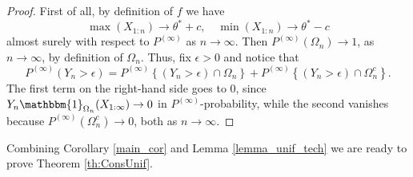 \documentclass[12pt]{article}
\begin{document}
\begin{proof}
First of all, by definition of $f$ we have
\[
\max (X_{1:n}) \to  \theta^\ast + c, \quad \min (X_{1:n} ) \to \theta^\ast - c
\]
almost surely with respect to $P^{(\infty)}$ as $n \to \infty$. Then $P^{(\infty)}(\Omega_n) \to 1$, as $n \to \infty$, by definition of $\Omega_n$. Thus, fix $\epsilon > 0$ and notice that
\[
P^{(\infty)}\left(Y_n > \epsilon \right) = P^{(\infty)}\left\{\left(Y_n > \epsilon\right) \cap \Omega_n \right\} + P^{(\infty)}\left\{\left(Y_n > \epsilon\right) \cap \Omega_n^c \right\}.
\]
The first term on the right-hand side goes to $0$, since $Y_n\mathbbm{1}_{\Omega_n}(X_{1:\infty}) \to 0$ in $P^{(\infty)}$-probability, while the second vanishes because $P^{(\infty)}(\Omega_n^c) \to 0$, both as $n \to \infty$.
\end{proof}
Combining Corollary \ref{main_cor} and Lemma \ref{lemma_unif_tech} we are ready to prove Theorem \ref{th:ConsUnif}.
\end{document}
